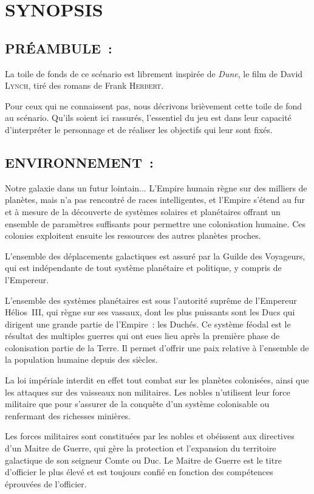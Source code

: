 \documentclass[14pt,twocolumn]{extarticle}
\begin{document}
\section{SYNOPSIS}

\subsection{PRÉAMBULE~:}

La toile de fonds de ce scénario est librement inspirée de \textit{Dune}, le
film de David \textsc{Lynch}, tiré des romans de Frank \textsc{Herbert}.

Pour ceux qui ne connaissent pas, nous décrivons brièvement cette toile de fond
au scénario. Qu'ils soient ici rassurés, l'essentiel du jeu est dans leur
capacité d'interpréter le personnage et de réaliser les objectifs qui leur
sont fixés.

\subsection{ENVIRONNEMENT~:}

Notre galaxie dans un futur lointain... L'Empire humain règne sur des milliers
de planètes, mais n'a pas rencontré de races intelligentes, et l'Empire s'étend
au fur et à mesure de la découverte de systèmes solaires et planétaires offrant
un ensemble de paramètres suffisants pour permettre une colonisation humaine.
Ces colonies exploitent ensuite les ressources des autres planètes proches.

L'ensemble des déplacements galactiques est assuré par la Guilde des Voyageurs,
qui est indépendante de tout système planétaire et politique, y compris de
l'Empereur.

L'ensemble des systèmes planétaires est sous l'autorité suprême de l'Empereur
Hélios~III, qui règne sur ses vassaux, dont les plus puissants sont les Ducs
qui dirigent une grande partie de l'Empire~: les Duchés. Ce système féodal est
le résultat des multiples guerres qui ont eues lieu après la première phase de
colonisation partie de la Terre. Il permet d'offrir une paix relative à
l'ensemble de la population humaine depuis des siècles.

La loi impériale interdit en effet tout combat sur les planètes colonisées,
ainsi que les attaques sur des vaisseaux non militaires. Les nobles n'utilisent
leur force militaire que pour s'assurer de la conquête d'un système colonisable
ou renfermant des richesses minières.

Les forces militaires sont constituées par les nobles et obéissent aux
directives d'un Maitre de Guerre, qui gère la protection et l'expansion du
territoire galactique de son seigneur Comte ou Duc. Le Maitre de Guerre
est le titre d'officier le plus élevé et est toujours confié en fonction des
compétences éprouvées de l'officier.
\end{document}
